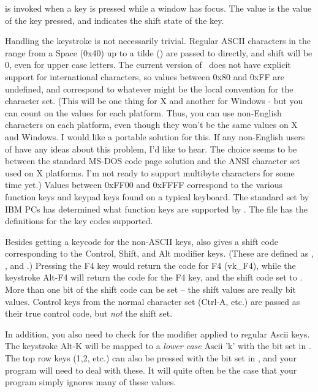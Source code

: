 
 is invoked when a key is pressed while a window has
focus. The  value is the  value of the key
pressed, and  indicates the shift state of the key.

Handling the keystroke is not necessarily trivial. Regular ASCII
characters in the range from a Space (0x40) up to a tilde (\tild)
are passed to  directly, and shift will be 0, even
for upper case letters. The current version of \V\ does not have
explicit support for international characters, so values between 0x80 and
0xFF are undefined, and correspond to whatever might be the local
convention for the character set.  (This will be one thing for
X and another for Windows - but you can count on the values
for each platform. Thus, you can use non-English characters
on each platform, even though they won't be the same values on X
and Windows. I would like a portable solution for this. If any
non-English users of \V have any ideas about this problem, I'd
like to hear. The choice seems to be between the standard
MS-DOS code page solution and the ANSI character set used
on X platforms. I'm not ready to support multibyte characters
for some time yet.) Values between 0xFF00 and 0xFFFF correspond to the
various function keys and keypad keys found on a typical
keyboard. The standard set by IBM PCs has determined what function keys
are supported by \V\@. The file  has the
definitions for the key codes supported. 

Besides getting a keycode for the non-ASCII keys, 
also gives a shift code corresponding to the Control, Shift, and
Alt modifier keys. (These are defined as ,
, and .) Pressing the F4 key
would return the code for F4 (vk\_F4), while the keystroke Alt-F4
will return the code for the F4 key, and the shift code set to
\@. More than one bit of the shift code can be
set -- the shift values are really bit values. Control keys from
the normal character set (Ctrl-A, etc.) are passed as their true
control code, but \emph{not} the  shift set.

In addition, you also need to check for the 
modifier applied to regular Ascii keys.  The keystroke Alt-K will
be mapped to a \emph{lower case} Ascii 'k' with the 
bit set in .  The top row keys (1,2, etc.) can also
be pressed with the   bit set in ,
and your program will need to deal with these.  It will quite
often be the case that your program simply ignores many of these
values.

